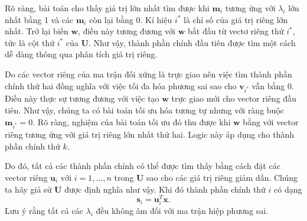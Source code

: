 \documentclass[12pt,a4paper,oneside]{report}
\numberwithin{equation}{section}
\begin{document}
Rõ ràng, bài toán cho thấy giá trị lớn nhất tìm được khi $\mathbf{m}_{i}$ tương ứng với $\lambda_{i}$ lớn nhất bằng 1 và các $\mathbf{m}_{i}$ còn lại bằng 0. Kí hiệu $i^{*}$ là chỉ số của giá trị riêng lớn nhất. Trở lại biến $\mathbf{w}$, điều này tương đương với $\mathbf{w}$ bắt đầu từ vectơ riêng thứ $i^{*}$, tức là cột thứ $i^{*}$ của $\mathbf{U}$. Như vậy, thành phần chính đầu tiên được tìm một cách dễ dàng thông qua phân tích giá trị riêng.

Do các vector riêng của ma trận đối xứng là trực giao nên việc tìm thành phần chính thứ hai đồng nghĩa với việc tối đa hóa phương sai sao cho $\mathbf{v}_{i^{*}}$ vẫn bằng 0. Điều này thực sự tương đương với việc tạo $\mathbf{w}$ trực giao mới cho vector riêng đầu tiên. Như vậy, chúng ta có bài toán tối ưu hóa tương tự nhưng với ràng buộc $\mathbf{m}_{i^{*}}=0$. Rõ ràng, nghiệm của bài toán tối ưu đó thu được khi $\mathbf{w}$ bằng với vector riêng tương ứng với giá trị riêng lớn nhất thứ hai. Logic này áp dụng cho thành phần chính thứ $k$.

Do đó, tất cả các thành phần chính có thể được tìm thấy bằng cách đặt các vector riêng $\mathbf{u}_{i}\text { với } i=1, \ldots, n$ trong $\mathbf{U}$ sao cho các giá trị riêng giảm dần. Chúng ta hãy giả sử $\mathbf{U}$ được định nghĩa như vậy. Khi đó thành phần chính thứ $i$ có dạng
$$
\mathbf{s}_{i}=\mathbf{u}_{i}^{T}\mathbf{ x}.
$$
Lưu ý rằng tất cả các $\lambda_{i}$ đều không âm đối với ma trận hiệp phương sai.
\end{document}
